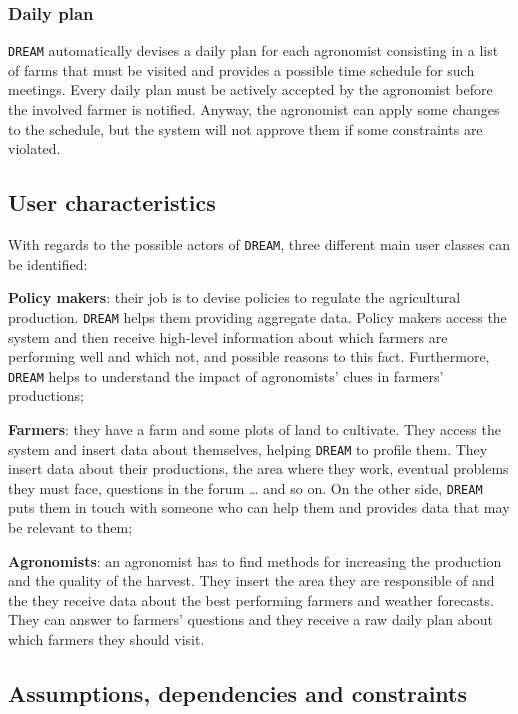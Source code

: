 \documentclass{article}
\begin{document}
\subsubsection{Daily plan}
\verb|DREAM| automatically devises a daily plan for each agronomist consisting in a list of farms that must be visited and provides a possible time schedule for such meetings. Every daily plan must be actively accepted 
by the agronomist before the involved farmer is notified. Anyway, the agronomist can apply some changes 
to the schedule, but the system will not approve them if some constraints are violated.
\subsection{User characteristics}
With regards to the possible actors of \verb|DREAM|, three different main user classes can be identified:
\begin{description}
\item \textbf{Policy makers}: their job is to devise policies to regulate the agricultural production. \verb|DREAM| helps 
them providing aggregate data. Policy makers access the system and then receive high-level 
information about which farmers are performing well and which not, and possible reasons to this 
fact. Furthermore, \verb|DREAM| helps to understand the impact of agronomists’ clues in farmers’ 
productions;
\item \textbf{Farmers}: they have a farm and some plots of land to cultivate. They access the system and insert 
data about themselves, helping \verb|DREAM| to profile them. They insert data about their productions, 
the area where they work, eventual problems they must face, questions in the forum … and so on. 
On the other side, \verb|DREAM| puts them in touch with someone who can help them and provides data 
that may be relevant to them;
\item \textbf{Agronomists}: an agronomist has to find methods for increasing the production and the quality of 
the harvest. They insert the area they are responsible of and the they receive data about the best 
performing farmers and weather forecasts. They can answer to farmers’ questions and they receive 
a raw daily plan about which farmers they should visit.
\end{description}
\subsection{Assumptions, dependencies and constraints}
\end{document}
